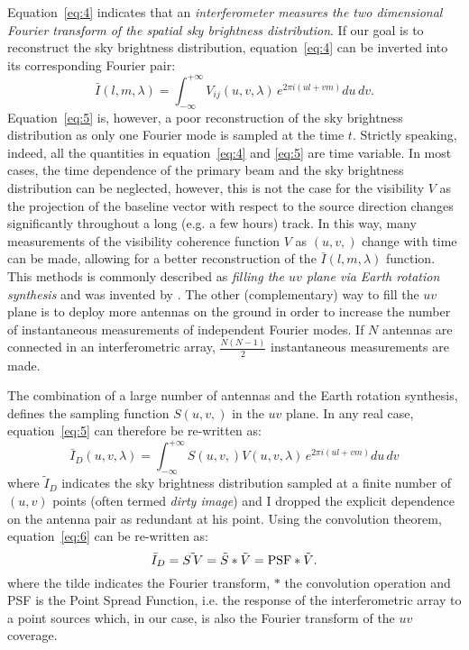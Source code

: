 Equation~\ref{eq:4} indicates that an {\it interferometer measures the two dimensional Fourier transform of the spatial sky brightness distribution}. If our goal is to reconstruct the sky brightness distribution, equation~\ref{eq:4} can be inverted into its corresponding Fourier pair:
\begin{equation}
{\bar I} (l, m, \lambda) = \int_{- \infty}^{+ \infty} V_{ij} (u,v, \lambda) \, e^{2 \pi i (ul + vm)} du \, dv.
\label{eq:5}
\end{equation}
Equation~\ref{eq:5} is, however, a poor reconstruction of the sky brightness distribution as only one Fourier mode is sampled at the time $t$. Strictly speaking, indeed, all the quantities in equation~\ref{eq:4} and \ref{eq:5} are time variable. In most cases, the time dependence of the primary beam and the sky brightness distribution can be neglected, however, this is not the case for the visibility $V$ as the projection of the baseline vector with respect to the source direction changes significantly throughout a long (e.g. a few hours) track. In this way, many measurements of the visibility coherence function $V$ as $(u,v,)$ change with time can be made, allowing for a better reconstruction of the ${\bar I} (l, m, \lambda)$ function. This methods is commonly described as {\it filling the $uv$ plane via Earth rotation synthesis} and was invented by \cite{???}. The other (complementary) way to fill the $uv$ plane is to deploy more antennas on the ground in order to increase the number of instantaneous measurements of independent Fourier modes. If $N$ antennas are connected in an interferometric array, $\frac{N (N - 1)}{2}$ instantaneous measurements are made. 

The combination of a large number of antennas and the Earth rotation synthesis, defines the sampling function $S(u,v,)$ in the $uv$ plane. In any real case, equation~\ref{eq:5} can therefore be re-written as:
\begin{equation}
{\bar I}_D (u, v, \lambda) = \int_{- \infty}^{+ \infty} S(u,v,) V (u,v, \lambda) \, e^{2 \pi i (ul + vm)} du \, dv
\label{eq:6}
\end{equation}
where ${\tilde I}_D$ indicates the sky brightness distribution sampled at a finite number of $(u,v)$ points (often termed {\it dirty image}) and I dropped the explicit dependence on the antenna pair as redundant at his point. Using the convolution theorem, equation~\ref{eq:6} can be re-written as:
\begin{equation}
{\bar I}_D  =  \tilde{S \, V} =  {\tilde S} \ast {\tilde V} = {\rm PSF} \ast {\tilde V}.
\label{eq:6}
\end{equation}
where the tilde indicates the Fourier transform, $\ast$ the convolution operation and {\rm PSF} is the Point Spread Function, i.e. the response of the interferometric array to a point sources which, in our case, is also the Fourier transform of the $uv$ coverage.


